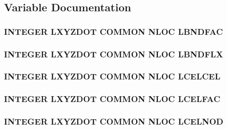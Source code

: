 \subsection{Variable Documentation}
\hypertarget{nloc_8com_a42041e6989af6cbb2608df9c0d079dea}{
\subsubsection[{L\-B\-N\-D\-F\-A\-C}]{\setlength{\rightskip}{0pt plus 5cm}I\-N\-T\-E\-G\-E\-R L\-X\-Y\-Z\-D\-O\-T C\-O\-M\-M\-O\-N N\-L\-O\-C L\-B\-N\-D\-F\-A\-C}}\label{nloc_8com_a42041e6989af6cbb2608df9c0d079dea}
\hypertarget{nloc_8com_a91109db3fe2ba82c0a5d1f145597641b}{
\subsubsection[{L\-B\-N\-D\-F\-L\-X}]{\setlength{\rightskip}{0pt plus 5cm}I\-N\-T\-E\-G\-E\-R L\-X\-Y\-Z\-D\-O\-T C\-O\-M\-M\-O\-N N\-L\-O\-C L\-B\-N\-D\-F\-L\-X}}\label{nloc_8com_a91109db3fe2ba82c0a5d1f145597641b}
\hypertarget{nloc_8com_ae39c32ca2db16a8fca699e2af80435aa}{
\subsubsection[{L\-C\-E\-L\-C\-E\-L}]{\setlength{\rightskip}{0pt plus 5cm}I\-N\-T\-E\-G\-E\-R L\-X\-Y\-Z\-D\-O\-T C\-O\-M\-M\-O\-N N\-L\-O\-C L\-C\-E\-L\-C\-E\-L}}\label{nloc_8com_ae39c32ca2db16a8fca699e2af80435aa}
\hypertarget{nloc_8com_a2bcb7bc1e5f56d5c6f4214e11c6a2d6d}{
\subsubsection[{L\-C\-E\-L\-F\-A\-C}]{\setlength{\rightskip}{0pt plus 5cm}I\-N\-T\-E\-G\-E\-R L\-X\-Y\-Z\-D\-O\-T C\-O\-M\-M\-O\-N N\-L\-O\-C L\-C\-E\-L\-F\-A\-C}}\label{nloc_8com_a2bcb7bc1e5f56d5c6f4214e11c6a2d6d}
\hypertarget{nloc_8com_acb705f72dc7fda4b4587e054e5be18cb}{
\subsubsection[{L\-C\-E\-L\-N\-O\-D}]{\setlength{\rightskip}{0pt plus 5cm}I\-N\-T\-E\-G\-E\-R L\-X\-Y\-Z\-D\-O\-T C\-O\-M\-M\-O\-N N\-L\-O\-C L\-C\-E\-L\-N\-O\-D}}\label{nloc_8com_acb705f72dc7fda4b4587e054e5be18cb}
